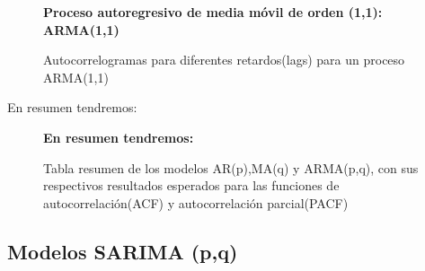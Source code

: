 \begin{figure}[h!]
	\centering
	\textbf{Proceso autoregresivo de media móvil de orden (1,1): ARMA(1,1)}\par\medskip
	\caption{Autocorrelogramas para diferentes retardos(lags) para un proceso ARMA(1,1)}\label{fig16}
\end{figure}


En resumen tendremos:

\begin{figure}[h]
	\centering
	\textbf{En resumen tendremos:}\par\medskip
	\caption{Tabla resumen de los modelos AR(p),MA(q) y ARMA(p,q), con sus respectivos resultados esperados para las funciones de autocorrelación(ACF) y autocorrelación parcial(PACF)}\label{fig14}
\end{figure}

\subsection{Modelos SARIMA (p,q)}


